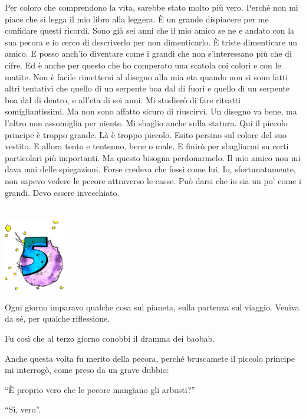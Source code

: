 \documentclass[11pt]{scrbook}
\begin{document}
Per coloro che comprendono la vita, sarebbe stato molto più vero. Perché non mi piace che si legga il mio libro alla leggera. È un grande dispiacere per me confidare questi ricordi. Sono già sei anni che il mio amico se ne e andato con la sua pecora e io cerco di descriverlo per non dimenticarlo. È triste dimenticare un amico. E posso anch'io diventare come i grandi che non s'interessano più che di cifre. Ed è anche per questo che ho comperato una scatola coi colori e con le matite. Non è facile rimettersi al disegno alla mia eta quando non si sono fatti altri tentativi che quello di un serpente boa dal di fuori e quello di un serpente boa dal di dentro, e all'eta di sei anni. Mi studierò di fare ritratti somigliantissimi. Ma non sono affatto sicuro di riuscirvi. Un disegno va bene, ma l'altro non assomiglia per niente. Mi sbaglio anche sulla statura. Qui il piccolo principe è troppo grande. Là è troppo piccolo. Esito persino sul colore del suo vestito. E allora tento e tentenno, bene o male. E finirò per sbagliarmi su certi particolari più importanti. Ma questo bisogna perdonarmelo. Il mio amico non mi dava mai delle spiegazioni. Forse credeva che fossi come lui. Io, sfortunatamente, non sapevo vedere le pecore attraverso le casse. Può darsi che io sia un po' come i grandi. Devo essere invecchiato.

\chapter{}
\begin{center}
\includegraphics{img/chapter5}
\end{center}

Ogni giorno imparavo qualche cosa sul pianeta, sulla partenza sul viaggio. Veniva da sé, per qualche riflessione.

Fu così che al terzo giorno conobbi il dramma dei baobab.

Anche questa volta fu merito della pecora, perché bruscamete il piccolo principe mi interrogò, come preso da un grave dubbio:

``È proprio vero che le pecore mangiano gli arbusti?''

``Sì, vero''.
\end{document}
